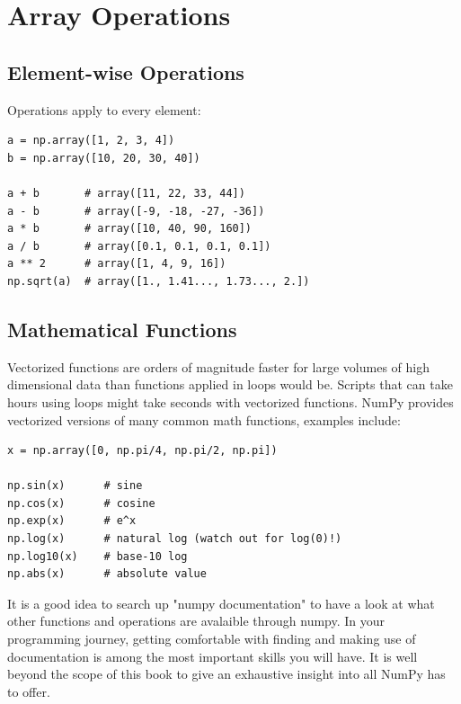 \section{Array Operations}
\label{sec:array-operations}

\subsection{Element-wise Operations}

Operations apply to every element:

\begin{lstlisting}
a = np.array([1, 2, 3, 4])
b = np.array([10, 20, 30, 40])

a + b       # array([11, 22, 33, 44])
a - b       # array([-9, -18, -27, -36])
a * b       # array([10, 40, 90, 160])
a / b       # array([0.1, 0.1, 0.1, 0.1])
a ** 2      # array([1, 4, 9, 16])
np.sqrt(a)  # array([1., 1.41..., 1.73..., 2.])
\end{lstlisting}

\subsection{Mathematical Functions}

Vectorized functions are orders of magnitude faster for large volumes of high dimensional data than functions applied in loops would be. Scripts that can take hours using loops might take seconds with vectorized functions. NumPy provides vectorized versions of many common math functions, examples include: 

\begin{lstlisting}
x = np.array([0, np.pi/4, np.pi/2, np.pi])

np.sin(x)      # sine
np.cos(x)      # cosine
np.exp(x)      # e^x
np.log(x)      # natural log (watch out for log(0)!)
np.log10(x)    # base-10 log
np.abs(x)      # absolute value
\end{lstlisting}

\begin{tip}
It is a good idea to search up "numpy documentation" to have a look at what other functions and operations are avalaible through numpy. In your programming journey, getting comfortable with finding and making use of documentation is among the most important skills you will have. It is well beyond the scope of this book to give an exhaustive insight into all NumPy has to offer.
\end{tip}


